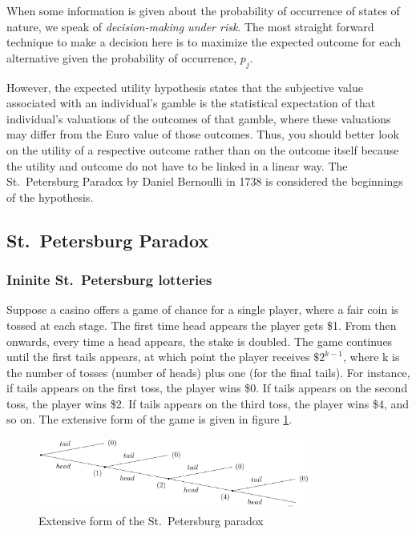 \documentclass[
  12pt,
  oneside]{book}
\theoremstyle{definition}
\theoremstyle{definition}
\theoremstyle{definition}
\theoremstyle{definition}
\theoremstyle{remark}
\begin{document}
When some information is given about the probability of occurrence of states of nature, we speak of \emph{decision-making under risk}. The most straight forward technique to make a decision here is to maximize the expected outcome for each alternative given the probability of occurrence, \(p_j\).

However, the expected utility hypothesis states that the subjective value associated with an individual's gamble is the statistical expectation of that individual's valuations of the outcomes of that gamble, where these valuations may differ from the Euro value of those outcomes. Thus, you should better look on the utility of a respective outcome rather than on the outcome itself because the utility and outcome do not have to be linked in a linear way. The St.~Petersburg Paradox by Daniel Bernoulli in 1738 is considered the beginnings of the hypothesis.

\hypertarget{st.-petersburg-paradox}{%
\subsection{St.~Petersburg Paradox}\label{st.-petersburg-paradox}}

\hypertarget{ininite-st.-petersburg-lotteries}{%
\subsubsection{Ininite St.~Petersburg lotteries}\label{ininite-st.-petersburg-lotteries}}

Suppose a casino offers a game of chance for a single player, where a fair coin is tossed at each stage. The first time head appears the player gets \$1. From then onwards, every time a head appears, the stake is doubled. The game continues until the first tails appears, at which point the player receives \(\$ 2^{k-1}\), where k is the number of tosses (number of heads) plus one (for the final tails).
For instance, if tails appears on the first toss, the player wins \$0. If tails appears on the second toss, the player wins \$2. If tails appears on the third toss, the player wins \$4, and so on. The extensive form of the game is given in figure \ref{fig:spextensiveform}.

\begin{figure}
\centering
\includegraphics[width=0.8\textwidth,height=\textheight]{fig/spextensiveform.png}
\caption{\label{fig:spextensiveform} Extensive form of the St.~Petersburg paradox}
\end{figure}
\end{document}

